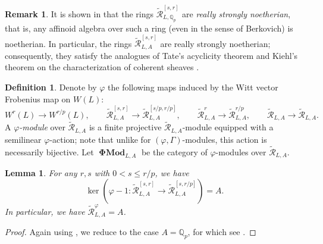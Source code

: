 \documentclass[12pt]{amsart}
\newtheorem{lemma}[theorem]{Lemma}
\theoremstyle{definition}
\newtheorem{defn}[theorem]{Definition}
\newtheorem{remark}[theorem]{Remark}
\numberwithin{equation}{theorem}
\newcommand{\QQ}{\mathbb{Q}}
\newcommand{\calR}{\mathcal{R}}
\DeclareMathOperator{\PhiMod}{\mathbf{\Phi Mod}}
\begin{document}
\begin{remark} \label{R:glueing lemma}
It is shown in \cite[Theorem~3.2]{kedlaya-noetherian} that the rings $\tilde{\calR}^{[s,r]}_{L,\QQ_p}$ are \emph{really strongly noetherian}, that is, any affinoid algebra over such a ring (even in the sense of Berkovich) is noetherian. In particular, the rings $\tilde{\calR}^{[s,r]}_{L,A}$ are really strongly noetherian; consequently, they satisfy the analogues of Tate's acyclicity theorem
\cite[Theorem~7.14, Theorem~8.3]{kedlaya-adic}
and Kiehl's theorem on the characterization of coherent sheaves
\cite[Theorem~8.16]{kedlaya-adic}.
\end{remark}

\begin{defn}
Denote by $\varphi$ the following maps induced by the Witt vector Frobenius map on $W(L)$:
\[
W^r(L) \to W^{r/p}(L), \qquad
\tilde{\calR}^{[s,r]}_{L,A} \to \tilde{\calR}^{[s/p,r/p]}_{L,A},
\qquad
\tilde{\calR}^{r}_{L,A} \to \tilde{\calR}^{r/p}_{L,A}, \qquad
\tilde{\calR}_{L,A} \to \tilde{\calR}_{L,A}.
\]
A \emph{$\varphi$-module} over $\tilde{\calR}_{L,A}$ is a finite projective $\tilde{\calR}_{L,A}$-module equipped with a semilinear $\varphi$-action;
note that unlike for $(\varphi, \Gamma)$-modules, this action is necessarily bijective.
Let $\PhiMod_{L,A}$ be the category of $\varphi$-modules over $\tilde{\calR}_{L,A}$.
\end{defn}

\begin{lemma} \label{L:phi invariants}
For any $r,s$ with $0 < s \leq r/p$, we have
\[
\ker(\varphi-1: \tilde{\calR}^{[s,r]}_{L,A} \to \tilde{\calR}^{[s,r/p]}_{L,A}) = A.
\]
In particular, we have $\tilde{\calR}_{L,A}^{\varphi} = A$.
\end{lemma}
\begin{proof}
Again using \cite[Lemma~2.2.9(b)]{kedlaya-liu1}, we reduce to the case $A = \QQ_p$,
for which see \cite[Corollary~5.2.4]{kedlaya-liu1}. 
\end{proof}
\end{document}
